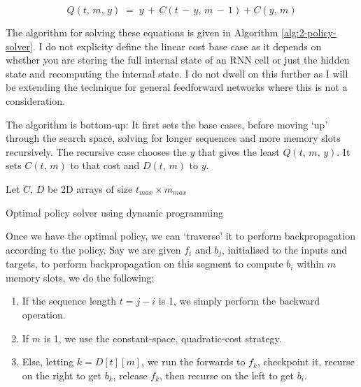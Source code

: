 \begin{equation*}
    Q(t,\, m,\, y) \;=\; y \,+\, C(t\,-\,y,\, m\,-\,1) + C(y,\, m)
\end{equation*}

The algorithm for solving these equations is given in Algorithm \ref{alg:2-policy-solver}.
I do not explicity define the linear cost base case as it depends on whether you are storing the full internal state of an RNN cell or just the hidden state and recomputing the internal state.
I do not dwell on this further as I will be extending the technique for general feedforward networks where this is not a consideration.

The algorithm is bottom-up:
It first sets the base cases, before moving `up' through the search space, solving for longer sequences and more memory slots recursively.
The recursive case chooses the \(y\) that gives the least \(Q(t,\, m,\, y)\).
It sets \(C(t,\, m)\) to that cost and \(D(t,\,m)\) to \(y\).

\begin{algorithm}[h]
\DontPrintSemicolon
{}
\BlankLine

Let \(C\), \(D\) be 2D arrays of size \(t_{max}\times m_{max}\)\;
\BlankLine
{}

\caption{Optimal policy solver using dynamic programming \cite[Algorithm~1]{Gruslys2016}}
\label{alg:2-policy-solver}
\end{algorithm}

Once we have the optimal policy, we can `traverse' it to perform backpropagation according to the policy.
Say we are given \(f_i\) and \(b_j\), initialised to the inputs and targets, to perform backpropagation on this segment to compute \(b_i\) within \(m\) memory slots, we do the following:
\begin{enumerate}
    \item If the sequence length \(t = j-i\) is 1, we simply perform the backward operation.
    \item If \(m\) is 1, we use the constant-space, quadratic-cost strategy.
    \item Else, letting \(k = D[t][m]\), we run the forwards to \(f_k\), checkpoint it, recurse on the right to get \(b_k\), release \(f_k\), then recurse on the left to get \(b_i\).
\end{enumerate}
